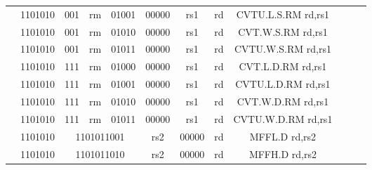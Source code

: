 \begin{table}[p]
\begin{small}
\begin{center}
\begin{tabular}{rcccccccccccl}
&
\multicolumn{1}{|c|}{1101010} &
\multicolumn{1}{c|}{001} &
\multicolumn{1}{c|}{rm} &
\multicolumn{2}{c|}{01001} &
\multicolumn{1}{c|}{00000} &
\multicolumn{1}{c|}{rs1} &
\multicolumn{1}{c|}{rd} & CVTU.L.S.RM rd,rs1 \\
\cline{2-9}
  

&
\multicolumn{1}{|c|}{1101010} &
\multicolumn{1}{c|}{001} &
\multicolumn{1}{c|}{rm} &
\multicolumn{2}{c|}{01010} &
\multicolumn{1}{c|}{00000} &
\multicolumn{1}{c|}{rs1} &
\multicolumn{1}{c|}{rd} & CVT.W.S.RM rd,rs1 \\
\cline{2-9}
  

&
\multicolumn{1}{|c|}{1101010} &
\multicolumn{1}{c|}{001} &
\multicolumn{1}{c|}{rm} &
\multicolumn{2}{c|}{01011} &
\multicolumn{1}{c|}{00000} &
\multicolumn{1}{c|}{rs1} &
\multicolumn{1}{c|}{rd} & CVTU.W.S.RM rd,rs1 \\
\cline{2-9}
  

&
\multicolumn{1}{|c|}{1101010} &
\multicolumn{1}{c|}{111} &
\multicolumn{1}{c|}{rm} &
\multicolumn{2}{c|}{01000} &
\multicolumn{1}{c|}{00000} &
\multicolumn{1}{c|}{rs1} &
\multicolumn{1}{c|}{rd} & CVT.L.D.RM rd,rs1 \\
\cline{2-9}
  

&
\multicolumn{1}{|c|}{1101010} &
\multicolumn{1}{c|}{111} &
\multicolumn{1}{c|}{rm} &
\multicolumn{2}{c|}{01001} &
\multicolumn{1}{c|}{00000} &
\multicolumn{1}{c|}{rs1} &
\multicolumn{1}{c|}{rd} & CVTU.L.D.RM rd,rs1 \\
\cline{2-9}
  

&
\multicolumn{1}{|c|}{1101010} &
\multicolumn{1}{c|}{111} &
\multicolumn{1}{c|}{rm} &
\multicolumn{2}{c|}{01010} &
\multicolumn{1}{c|}{00000} &
\multicolumn{1}{c|}{rs1} &
\multicolumn{1}{c|}{rd} & CVT.W.D.RM rd,rs1 \\
\cline{2-9}
  

&
\multicolumn{1}{|c|}{1101010} &
\multicolumn{1}{c|}{111} &
\multicolumn{1}{c|}{rm} &
\multicolumn{2}{c|}{01011} &
\multicolumn{1}{c|}{00000} &
\multicolumn{1}{c|}{rs1} &
\multicolumn{1}{c|}{rd} & CVTU.W.D.RM rd,rs1 \\
\cline{2-9}
  

&
\multicolumn{1}{|c|}{1101010} &
\multicolumn{4}{c|}{1101011001} &
\multicolumn{1}{c|}{rs2} &
\multicolumn{1}{c|}{00000} &
\multicolumn{1}{c|}{rd} & MFFL.D rd,rs2 \\
\cline{2-9}
  

&
\multicolumn{1}{|c|}{1101010} &
\multicolumn{4}{c|}{1101011010} &
\multicolumn{1}{c|}{rs2} &
\multicolumn{1}{c|}{00000} &
\multicolumn{1}{c|}{rd} & MFFH.D rd,rs2 \\
\cline{2-9}
  


\end{tabular}
\end{center}
\end{small}
\end{table}

